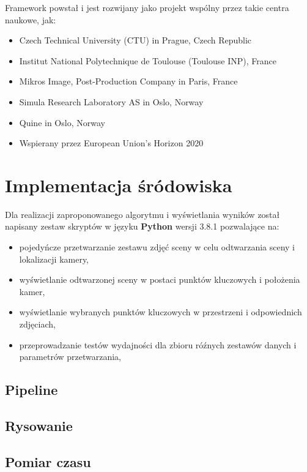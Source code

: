 Framework powstał i jest rozwijany jako projekt wspólny przez takie centra naukowe, jak:
\begin{itemize}
   \item Czech Technical University (CTU) in Prague, Czech Republic
   \item Institut National Polytechnique de Toulouse (Toulouse INP), France
   \item Mikros Image, Post-Production Company in Paris, France
   \item Simula Research Laboratory AS in Oslo, Norway
   \item Quine in Oslo, Norway
   \item Wspierany przez European Union’s Horizon 2020
\end{itemize}

\section{Implementacja śródowiska}

Dla realizacji zaproponowanego algorytmu i wyświetlania wyników został napisany zestaw skryptów w języku \textbf{Python} wersji 3.8.1 pozwalające na:
\begin{itemize}
   \item pojedyńcze przetwarzanie zestawu zdjęć sceny w celu odtwarzania sceny i lokalizacji kamery,
   \item wyświetlanie odtwarzonej sceny w postaci punktów kluczowych i położenia kamer,
   \item wyświetlanie wybranych punktów kluczowych w przestrzeni i odpowiednich zdjęciach,
   \item przeprowadzanie testów wydajności dla zbioru róźnych zestawów danych i parametrów przetwarzania,
\end{itemize}

\subsection{Pipeline}
\subsection{Rysowanie}
\subsection{Pomiar czasu}
